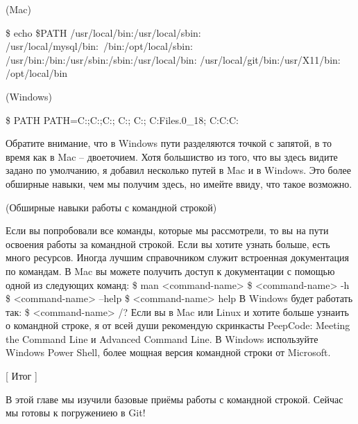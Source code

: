  (Mac)

 \$ echo \$PATH
/usr/local/bin:/usr/local/sbin:
/usr/local/mysql/bin:~/bin:/opt/local/sbin:
/usr/bin:/bin:/usr/sbin:/sbin:/usr/local/bin:
/usr/local/git/bin:/usr/X11/bin:
/opt/local/bin

(Windows)

\$ PATH
PATH=C:\Perl\site\bin;C:\Perl\bin;C:\Windows{};
C:\Windows;
C:\Windows{}\Wbem;
C:\Program Files\Java{}.0_18\bin;
C:\tools\;C:\;C:\bin

Обратите внимание, что в Windows пути разделяются точкой с запятой, в то время как
в Mac -- двоеточием. Хотя большиство из того, что вы здесь видите задано по умолчанию,
я добавил несколько путей в Mac и в Windows. Это более обширные навыки, чем мы получим 
здесь, но имейте ввиду, что такое возможно.

(Обширные навыки работы с командной строкой)

Если вы попробовали все команды, которые мы рассмотрели, то вы на пути освоения работы
за командной строкой. Если вы хотите узнать больше, есть много ресурсов. Иногда лучшим
справочником служит встроенная документация по командам. В Mac вы можете получить
доступ к документации с помощью одной из следующих команд:
\$ man <command-name>
\$ <command-name> -h
\$ <command-name> --help
\$ <command-name> help
В Windows будет работать так:
\$ <command-name> /?
Если вы в Mac или Linux и хотите больше узнаить о командной строке, я от всей души
рекомендую скринкасты PeepCode: Meeting the Command Line и Advanced Command Line.
В Windows используйте Windows Power Shell, более мощная версия командной строки от
Microsoft.

[ Итог ]

В этой главе мы изучили базовые приёмы работы с командной строкой. Сейчас мы готовы
к погружениею в Git!